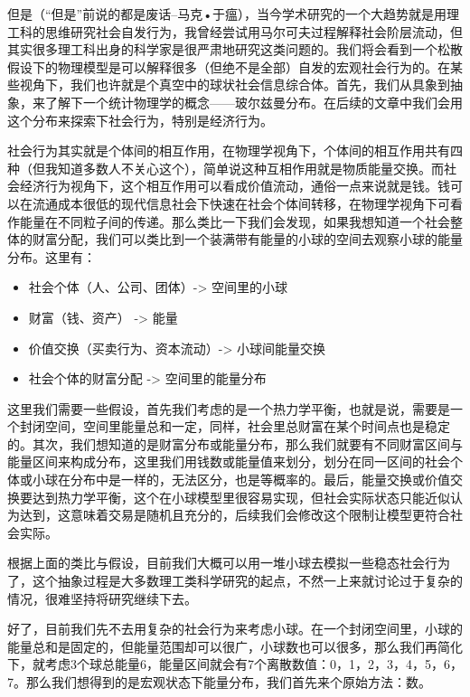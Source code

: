 \documentclass[
]{book}
\begin{document}
但是（``但是''前说的都是废话--马克•于瘟），当今学术研究的一个大趋势就是用理工科的思维研究社会自发行为，我曾经尝试用马尔可夫过程解释社会阶层流动，但其实很多理工科出身的科学家是很严肃地研究这类问题的。我们将会看到一个松散假设下的物理模型是可以解释很多（但绝不是全部）自发的宏观社会行为的。在某些视角下，我们也许就是个真空中的球状社会信息综合体。首先，我们从具象到抽象，来了解下一个统计物理学的概念------玻尔兹曼分布。在后续的文章中我们会用这个分布来探索下社会行为，特别是经济行为。

社会行为其实就是个体间的相互作用，在物理学视角下，个体间的相互作用共有四种（但我知道多数人不关心这个），简单说这种互相作用就是物质能量交换。而社会经济行为视角下，这个相互作用可以看成价值流动，通俗一点来说就是钱。钱可以在流通成本很低的现代信息社会下快速在社会个体间转移，在物理学视角下可看作能量在不同粒子间的传递。那么类比一下我们会发现，如果我想知道一个社会整体的财富分配，我们可以类比到一个装满带有能量的小球的空间去观察小球的能量分布。这里有：

\begin{itemize}
\item
  社会个体（人、公司、团体）-\textgreater{} 空间里的小球
\item
  财富（钱、资产） -\textgreater{} 能量
\item
  价值交换（买卖行为、资本流动）-\textgreater{} 小球间能量交换
\item
  社会个体的财富分配 -\textgreater{} 空间里的能量分布
\end{itemize}

这里我们需要一些假设，首先我们考虑的是一个热力学平衡，也就是说，需要是一个封闭空间，空间里能量总和一定，同样，社会里总财富在某个时间点也是稳定的。其次，我们想知道的是财富分布或能量分布，那么我们就要有不同财富区间与能量区间来构成分布，这里我们用钱数或能量值来划分，划分在同一区间的社会个体或小球在分布中是一样的，无法区分，也是等概率的。最后，能量交换或价值交换要达到热力学平衡，这个在小球模型里很容易实现，但社会实际状态只能近似认为达到，这意味着交易是随机且充分的，后续我们会修改这个限制让模型更符合社会实际。

根据上面的类比与假设，目前我们大概可以用一堆小球去模拟一些稳态社会行为了，这个抽象过程是大多数理工类科学研究的起点，不然一上来就讨论过于复杂的情况，很难坚持将研究继续下去。

好了，目前我们先不去用复杂的社会行为来考虑小球。在一个封闭空间里，小球的能量总和是固定的，但能量范围却可以很广，小球数也可以很多，那么我们再简化下，就考虑3个球总能量6，能量区间就会有7个离散数值：0，1，2，3，4，5，6，7。那么我们想得到的是宏观状态下能量分布，我们首先来个原始方法：数。
\end{document}
